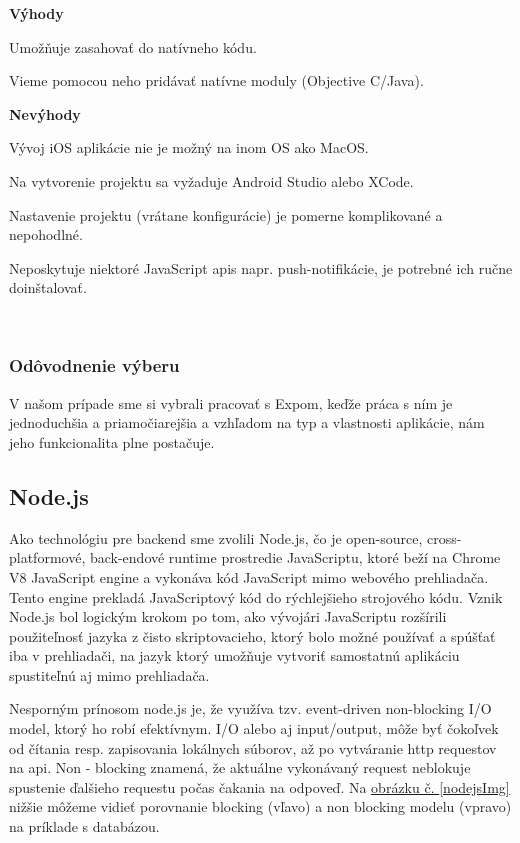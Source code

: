 {\bf Výhody}
\begin{itemize}
{\item Umožňuje zasahovať do natívneho kódu.} 
{\item Vieme pomocou neho pridávať natívne moduly (Objective C/Java).} \cite{rncli} 
\end{itemize}

{\bf Nevýhody}
\begin{itemize}
{\item Vývoj iOS aplikácie nie je možný na inom OS ako MacOS.} 
{\item Na vytvorenie projektu sa vyžaduje Android Studio alebo XCode.}
{\item Nastavenie projektu (vrátane konfigurácie) je pomerne komplikované a nepohodlné.} 
{\item Neposkytuje niektoré JavaScript \acrshort{api}s napr. push-notifikácie, je potrebné ich ručne doinštalovať.} \cite{rncli} \\
\end{itemize}

\subsubsection{Odôvodnenie výberu}
V našom prípade sme si vybrali pracovať s Expom, keďže práca s ním je jednoduchšia a priamočiarejšia a vzhľadom na typ a vlastnosti aplikácie, nám jeho funkcionalita plne postačuje. \\

\subsection{Node.js}
Ako technológiu pre backend sme zvolili Node.js, čo je open-source, cross-platformové, back-endové runtime prostredie JavaScriptu, ktoré beží na Chrome V8 JavaScript engine a vykonáva kód JavaScript mimo webového prehliadača. \cite{nodejswiki} Tento engine prekladá JavaScriptový kód do rýchlejšieho strojového kódu. Vznik Node.js bol logickým krokom po tom, ako vývojári JavaScriptu rozšírili použiteľnosť jazyka z čisto skriptovacieho, ktorý bolo možné používať a spúšťať iba v prehliadači, na jazyk ktorý umožňuje vytvoriť samostatnú aplikáciu spustiteľnú aj mimo prehliadača. 

Nesporným prínosom node.js je, že využíva tzv. event-driven non-blocking I/O model, ktorý ho robí efektívnym. I/O alebo aj input/output, môže byť čokoľvek od čítania resp. zapisovania lokálnych súborov, až po vytváranie \acrshort{http} requestov na \acrshort{api}. Non - blocking znamená, že aktuálne vykonávaný request neblokuje spustenie ďalšieho requestu počas čakania na odpoveď. Na \hyperref[nodejsImg]{ obrázku č. \ref{nodejsImg}} nižšie môžeme vidieť porovnanie blocking (vľavo) a non blocking modelu (vpravo) na príklade s databázou. \cite{nodejs} \\

